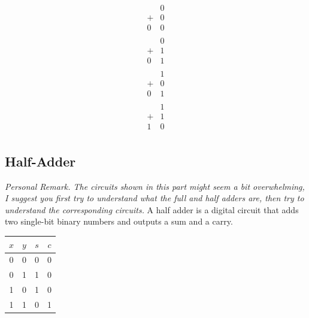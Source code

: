 \documentclass[12pt,openany, tikz,border=10pt]{book}
\begin{document}
			      	\[
			      		\begin{array}{cccccc}
			      			  & 0 \\
			      			+ & 0 \\
			      			\hline
			      			0 & 0 \\
			      		\end{array}
			      	\]
			      	\[
			      		\begin{array}{cccccc}
			      			  & 0 \\
			      			+ & 1 \\
			      			\hline
			      			0 & 1 \\
			      		\end{array}
			      	\]
			      	\[
			      		\begin{array}{cccccc}
			      			  & 1 \\
			      			+ & 0 \\
			      			\hline
			      			0 & 1 \\
			      		\end{array}
			      	\]
			      	\[
			      		\begin{array}{cccccc}
			      			  & 1 \\
			      			+ & 1 \\
			      			\hline
			      			1 & 0 \\
			      		\end{array}
			      	\]
			      	
			      	\newpage
			      	\subsection{Half-Adder}
			      	\textit{Personal Remark. The circuits shown in this part might seem a bit overwhelming, I suggest you first try to understand what the full and half adders are, then try to understand the corresponding circuits.} 
			      	\newline
			      	\vspace{10px}
			      	A half adder is a digital circuit that adds two single-bit binary numbers and outputs a sum and a carry. 
			      	
			      	
			      	\begin{table}[h!]
			      		\centering
			      		\begin{tabular}{cccc}
			      			\hline
			      			$x$ & $y$ & $s$ & $c$ \\
			      			\hline
			      			0   & 0   & 0   & 0   \\
			      			0   & 1   & 1   & 0   \\
			      			1   & 0   & 1   & 0   \\
			      			1   & 1   & 0   & 1   \\
			      			\hline
			      		\end{tabular}
			      	\end{table}
			      	
\end{document}
